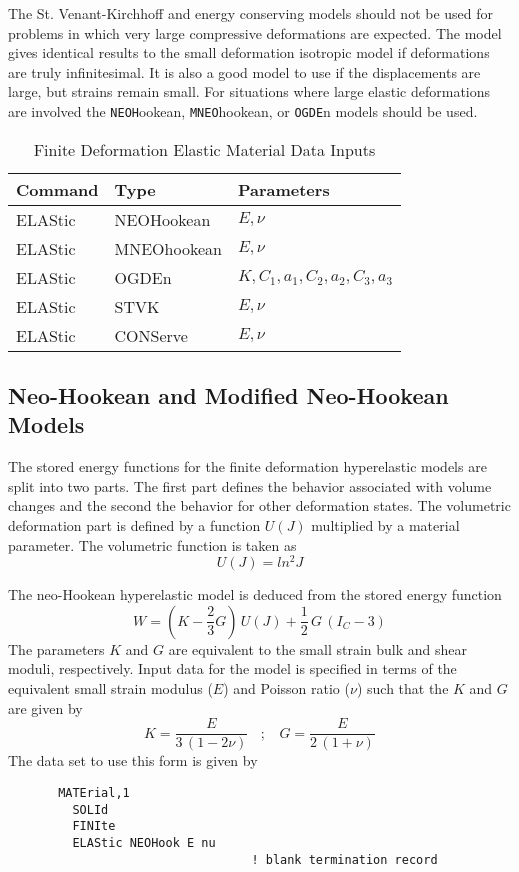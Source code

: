 The St. Venant-Kirchhoff and energy conserving models should not be used
for problems
in which very large compressive deformations are expected.  The model gives
identical results to the small deformation isotropic model if deformations
are truly infinitesimal.  It is also a good model to use if the displacements
are large, but strains remain small.  For situations where large elastic
deformations are involved the {\tt NEOH}ookean, {\tt MNEO}hookean,
or {\tt OGDE}n models should be used.

\begin{table}[ht!]
\begin{center}
\begin{tabular}{| l | l | l |} \hline
Command & Type & Parameters \\ \hline
ELAStic & NEOHookean & $E, \nu$ \\
ELAStic & MNEOhookean & $E, \nu$ \\
ELAStic & OGDEn & $K, C_1, a_1, C_2, a_2, C_3, a_3$ \\
ELAStic & STVK & $E, \nu$ \\
ELAStic & CONServe & $E, \nu$ \\ \hline
\end{tabular}
\end{center}
\caption{Finite Deformation Elastic Material Data Inputs}
\label{tab131c}
\end{table}

\subsection{Neo-Hookean and Modified Neo-Hookean Models}

The stored energy functions for the finite deformation hyperelastic models
are split into two parts.  The first part defines the behavior associated
with volume changes and the second the behavior for other deformation states.
The volumetric deformation part is defined by a function $U(J)$ multiplied
by a material parameter.  The volumetric function is taken as
\begin{equation}
U(J) = ln^2 J
\end{equation}

The neo-Hookean hyperelastic model is deduced from the stored energy function
\begin{equation}
W = \left( K  - \frac{2}{3} G \right) \, U(J)
+ \frac{1}{2} \, G \, \left( I_C - 3 \right)
\end{equation}
The parameters $K$ and $G$ are equivalent to the small strain bulk and shear
moduli, respectively.  Input data for the model is specified in terms of
the equivalent small strain modulus ($E$) and Poisson ratio ($\nu$) such that
the $K$ and $G$ are given by
\begin{equation}
\label{enu}
K = \frac{E}{3 \, ( 1 - 2 \nu )} ~~~~;~~~~ G = \frac{E}{2 \, ( 1 + \nu )}
\end{equation}
The data set to use this form is given by
\begin{verbatim}
       MATErial,1
         SOLId
         FINIte
         ELAStic NEOHook E nu
                                  ! blank termination record
\end{verbatim}

